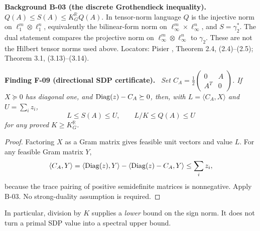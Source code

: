 \documentclass[11pt]{article}
\newcommand{\R}{\mathbb R}\newcommand{\C}{\mathbb C}
\newenvironment{finding}[2]{\par\medskip\noindent\textbf{Finding #1 (#2).}\ \itshape}{\par\medskip}
\newenvironment{background}[2]{\par\medskip\noindent\textbf{Background #1 (#2).}\ }{\par\medskip}
\begin{document}
\begin{background}{B-03}{the discrete Grothendieck inequality}
$Q(A)\leq S(A)\leq K_G^\R Q(A)$.
In tensor-norm language $Q$ is the injective norm on
$\ell_1^m\otimes\ell_1^n$, equivalently the bilinear-form norm on
$\ell_\infty^m\times\ell_\infty^n$, and $S=\gamma_2^*$.
The dual statement compares the projective norm on
$\ell_\infty^m\otimes\ell_\infty^n$ to $\gamma_2$.
These are not the Hilbert tensor norms used above.
Locators: Pisier \cite{Pis}, Theorem 2.4, (2.4)--(2.5);
Theorem 3.1, (3.13)--(3.14).
\end{background}

\begin{finding}{F-09}{directional SDP certificate}
Set $C_A=\frac12\left(\begin{smallmatrix}0&A\\A^T&0\end{smallmatrix}\right)$.
If $X\succeq0$ has diagonal one, and
$\operatorname{Diag}(z)-C_A\succeq0$, then, with
$L=\langle C_A,X\rangle$ and $U=\sum_i z_i$,
\[
 L\leq S(A)\leq U,\qquad L/K\leq Q(A)\leq U
\]
for any proved $K\geq K_G^\R$.
\end{finding}
\begin{proof}
Factoring $X$ as a Gram matrix gives feasible unit vectors and value
$L$. For any feasible Gram matrix $Y$,
\[
 \langle C_A,Y\rangle
 =\langle\operatorname{Diag}(z),Y\rangle-\langle\operatorname{Diag}(z)-C_A,Y\rangle
 \leq\sum_i z_i,
\]
because the trace pairing of positive semidefinite matrices is
nonnegative. Apply B-03. No strong-duality assumption is required.
\end{proof}
In particular, division by $K$ supplies a \emph{lower} bound on
the sign norm. It does not turn a primal SDP value into a spectral
upper bound.
\end{document}
